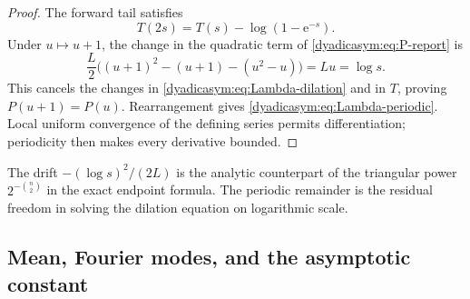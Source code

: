 \documentclass[11pt,oneside]{article}
\theoremstyle{definition}
\theoremstyle{remark}
\newcommand{\e}{\mathrm e}
\begin{document}
\begin{proof}
The forward tail satisfies
\begin{equation*}
 T(2s)=T(s)-\log(1-\e^{-s}).
\end{equation*}
Under $u\mapsto u+1$, the change in the quadratic term of \eqref{dyadicasym:eq:P-report} is
\begin{equation*}
 \frac L2\bigl((u+1)^2-(u+1)-(u^2-u)\bigr)=Lu=\log s.
\end{equation*}
This cancels the changes in \eqref{dyadicasym:eq:Lambda-dilation} and in $T$, proving
$P(u+1)=P(u)$.  Rearrangement gives \eqref{dyadicasym:eq:Lambda-periodic}.  Local uniform convergence of
the defining series permits differentiation; periodicity then makes every derivative bounded.
\end{proof}

The drift $-(\log s)^2/(2L)$ is the analytic counterpart of the triangular power
$2^{-\binom n2}$ in the exact endpoint formula.  The periodic remainder is the residual
freedom in solving the dilation equation on logarithmic scale.

\subsection{Mean, Fourier modes, and the asymptotic constant}
\end{document}
